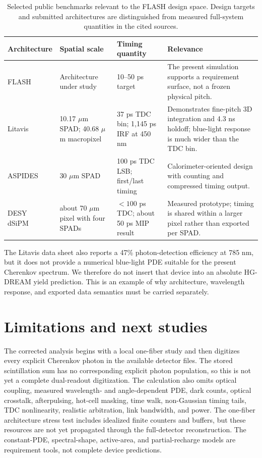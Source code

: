\documentclass[a4paper,11pt]{article}
\begin{document}
\begin{table}[htbp]
\centering
\caption{\label{tab:devices}Selected public benchmarks relevant to the FLASH
design space. Design targets and submitted architectures are distinguished
from measured full-system quantities in the cited sources.}
\smallskip
\begin{tabular}{p{2.1cm}p{2.6cm}p{2.7cm}p{5.0cm}}
\toprule
Architecture & Spatial scale & Timing quantity & Relevance \\
\midrule
FLASH & Architecture under study & 10--50 ps target & The present simulation supports a requirement surface, not a frozen physical pitch. \\
Litavis~\cite{litavis2026} & 10.17 $\mu$m SPAD; 40.68 $\mu$m macropixel & 37 ps TDC bin; 1,145 ps IRF at 450 nm & Demonstrates fine-pitch 3D integration and 4.3 ns holdoff; blue-light response is much wider than the TDC bin. \\
ASPIDES~\cite{aspides2025} & 30 $\mu$m SPAD & 100 ps TDC LSB; first/last timing & Calorimeter-oriented design with counting and compressed timing output. \\
DESY dSiPM~\cite{feindt2024desy} & about 70 $\mu$m pixel with four SPADs & $<100$ ps TDC; about 50 ps MIP result & Measured prototype; timing is shared within a larger pixel rather than exported per SPAD. \\
\bottomrule
\end{tabular}
\end{table}

The Litavis data sheet also reports a 47\% photon-detection efficiency at
785 nm, but it does not provide a numerical blue-light PDE suitable for the
present Cherenkov spectrum. We therefore do not insert that device into an
absolute HG-DREAM yield prediction. This is an example of why architecture,
wavelength response, and exported data semantics must be carried separately.

\section{Limitations and next studies}
\label{sec:limitations}

The corrected analysis begins with a local one-fiber study and then digitizes
every explicit Cherenkov photon in the available detector files. The stored
scintillation sum has no corresponding explicit photon population, so this is
not yet a complete dual-readout digitization. The calculation also omits
optical coupling, measured wavelength- and angle-dependent PDE, dark counts,
optical crosstalk, afterpulsing, hot-cell masking, time walk, non-Gaussian
timing tails, TDC nonlinearity, realistic arbitration, link bandwidth, and
power. The one-fiber architecture stress test includes idealized finite
counters and buffers, but these resources are not yet propagated through the
full-detector reconstruction. The constant-PDE, spectral-shape, active-area,
and partial-recharge models are requirement tools, not complete device
predictions.
\end{document}
